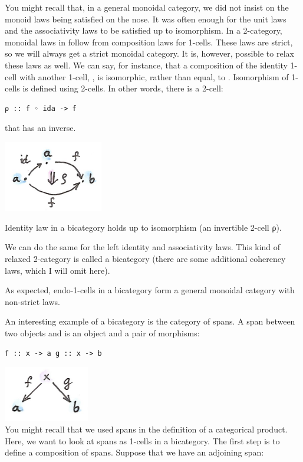 You might recall that, in a general monoidal category, we did not insist
on the monoid laws being satisfied on the nose. It was often enough for
the unit laws and the associativity laws to be satisfied up to
isomorphism. In a 2-category, monoidal laws in  follow
from composition laws for 1-cells. These laws are strict, so we will
always get a strict monoidal category. It is, however, possible to relax
these laws as well. We can say, for instance, that a composition of the
identity 1-cell  with another 1-cell,
, is isomorphic, rather than equal,
to . Isomorphism of 1-cells is defined using 2-cells. In other
words, there is a 2-cell:

\begin{Verbatim}[commandchars=\\\{\}]
ρ :: f ◦ ida -> f
\end{Verbatim}

that has an inverse.

\hypertarget{attachment_9107}{}
\includegraphics[width=1.70833in]{images/bicat.png}

Identity law in a bicategory holds up to isomorphism (an invertible
2-cell ρ).

We can do the same for the left identity and associativity laws. This
kind of relaxed 2-category is called a bicategory (there are some
additional coherency laws, which I will omit here).

As expected, endo-1-cells in a bicategory form a general monoidal
category with non-strict laws.

An interesting example of a bicategory is the category of spans. A span
between two objects  and  is an object 
and a pair of morphisms:

\begin{Verbatim}[commandchars=\\\{\}]
f :: x -> a g :: x -> b
\end{Verbatim}

\includegraphics[width=1.46875in]{images/span.png}\\
You might recall that we used spans in the definition of a categorical
product. Here, we want to look at spans as 1-cells in a bicategory. The
first step is to define a composition of spans. Suppose that we have an
adjoining span:

